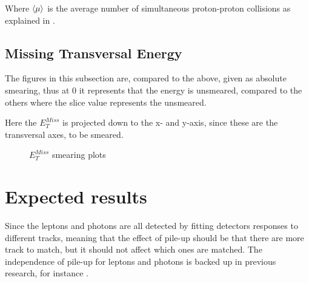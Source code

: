 Where $\left<\mu\right>$ is the average number of simultaneous proton-proton collisions as explained in .
\subsection{Missing Transversal Energy}
The figures in this subsection are, compared to the above, given as absolute smearing, thus at 0 it represents that the energy is unsmeared, compared to the others where the slice value represents the unsmeared.

Here the $E_T^{Miss}$ is projected down to the x- and y-axis, since these are the transversal axes, to be smeared. 
 \begin{figure}[H] %
    \hfill
        \hfill
   \caption{$E_T^{Miss}$ smearing plots}
    \label{fig:MET}
  \end{figure}
\newpage
\section{Expected results}\label{cha:vali:sec:expr}
Since the leptons and photons are all detected by fitting detectors responses to different tracks, meaning that the effect of pile-up should be that there are more track to match, but it should not affect which ones are matched. The independence of pile-up for leptons and photons is backed up in previous research, for instance \citep{Electronperf:2011, ATLAS:LOI2}.

